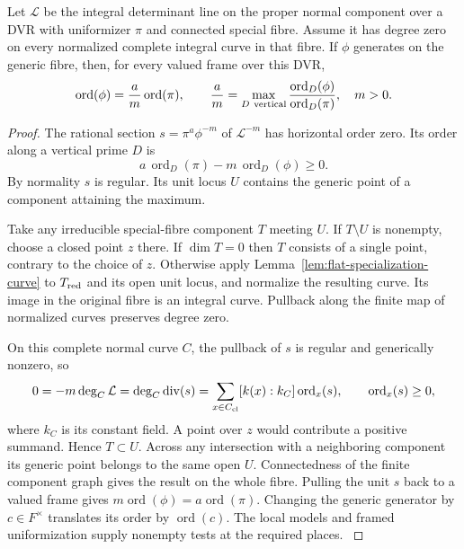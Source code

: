 \begin{lemma}\label{lem:flat-vertical-ratio}
Let \(\mathcal L\) be the integral determinant line on the proper
normal component over a DVR with uniformizer \(\pi\) and connected
special fibre. Assume it has degree zero on every normalized
complete integral curve in that fibre. If \(\phi\) generates on
the generic fibre, then, for every valued frame over this DVR,
\[
 \operatorname{ord}(\phi)=\frac{a}{m}\operatorname{ord}(\pi),\qquad
 \frac{a}{m}=\max_{D\ {\rm vertical}}
            \frac{\operatorname{ord}_D(\phi)}{\operatorname{ord}_D(\pi)},
 \quad m>0 .
\]
\end{lemma}
\begin{proof}
The rational section \(s=\pi^a\phi^{-m}\) of \(\mathcal L^{-m}\)
has horizontal order zero. Its order along a vertical prime \(D\) is
\[
 a\,\operatorname{ord}_D(\pi)-m\,\operatorname{ord}_D(\phi)\ge0 .
\]
By normality \(s\) is regular. Its unit locus \(U\) contains the
generic point of a component attaining the maximum.

Take any irreducible special-fibre component \(T\) meeting \(U\).
If \(T\setminus U\) is nonempty, choose a closed point \(z\) there.
If \(\dim T=0\) then \(T\) consists of a single point, contrary to
the choice of \(z\). Otherwise apply Lemma~\ref{lem:flat-specialization-curve}
to \(T_{\rm red}\) and its open unit locus, and normalize the resulting
curve. Its image in the original fibre is an integral curve. Pullback
along the finite map of normalized curves preserves degree zero.

On this complete normal curve \(C\), the pullback of \(s\) is
regular and generically nonzero, so
\[
 0=-m\deg_C\mathcal L=\deg_C\operatorname{div}(s)
       =\sum_{x\in C_{\rm cl}}[k(x):k_C]\operatorname{ord}_x(s),
 \qquad \operatorname{ord}_x(s)\ge0 ,
\]
where \(k_C\) is its constant field. A point over \(z\) would
contribute a positive summand. Hence \(T\subset U\). Across any
intersection with a neighboring component its generic point belongs
to the same open \(U\). Connectedness of the finite component graph
gives the result on the whole fibre. Pulling the unit \(s\) back to
a valued frame gives \(m\operatorname{ord}(\phi)=a\operatorname{ord}(\pi)\).
Changing the generic generator by \(c\in F^\times\) translates its
order by \(\operatorname{ord}(c)\). The local models and framed
uniformization supply nonempty tests at the required places.
\label{cor:deep-cover-flat-degree-7}
\end{proof}

